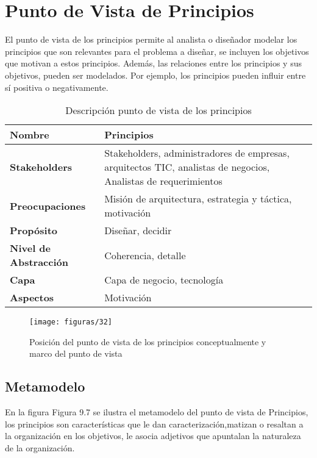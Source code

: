 \section{Punto de Vista de Principios}
El punto de vista de los principios permite al analista o diseñador modelar los principios que son relevantes para el problema a diseñar, se incluyen los objetivos que motivan a estos principios. Además, las relaciones entre los principios y sus objetivos, pueden ser modelados. Por ejemplo, los principios pueden influir entre sí positiva o negativamente.
   
   \begin{table}[H]
   	\centering
   	\begin{tabular}{lp{8cm}}
   		\toprule
   		\textbf{Nombre} & \textbf{Principios} \\
   		\midrule
   		\textbf{Stakeholders} & Stakeholders, administradores de empresas, arquitectos TIC, analistas de negocios, Analistas de requerimientos \\
   		\textbf{Preocupaciones} & Misión de arquitectura, estrategia y táctica, motivación \\
   		\textbf{Propósito} & Diseñar, decidir \\
   		\textbf{Nivel de Abstracción} & Coherencia, detalle \\
   		\textbf{Capa} & Capa de negocio, tecnología \\
   		\textbf{Aspectos} & Motivación \\
   		\bottomrule
   	\end{tabular}
   	\captionsetup{width=.95\textwidth}
   	\caption{Descripción punto de vista de los principios}
   	\label{tabla23}
   \end{table}
   
   \begin{figure}[H]
   	\centering
   	\texttt{[image: figuras/32]}
   	\captionsetup{width=.95\textwidth}
   	\caption{Posición del punto de vista de los principios conceptualmente y marco del punto de vista}
   	\label{figura32}
   \end{figure}
   
   \subsection{Metamodelo}
   En la figura Figura 9.7 se ilustra el metamodelo del punto de vista de Principios, los principios son características que le dan caracterización,matizan o resaltan a la organización en los objetivos, le asocia adjetivos que apuntalan la naturaleza de la organización.
   
